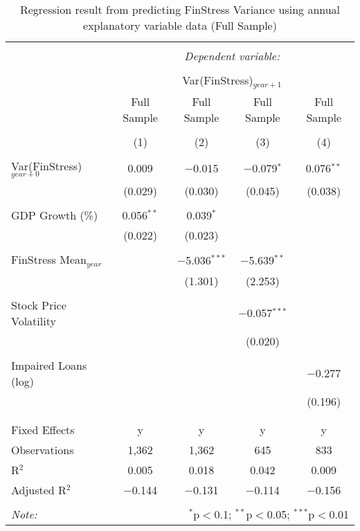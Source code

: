 
\begin{table}[!htbp] \centering 
  \caption{Regression result from predicting FinStress Variance using annual explanatory variable data (Full Sample)} 
  \label{annual_reg} 
\tiny 
\begin{tabular}{@{\extracolsep{5pt}}lcccc} 
\\[-1.8ex]\hline 
\hline \\[-1.8ex] 
 & \multicolumn{4}{c}{\textit{Dependent variable:}} \\ 
\cline{2-5} 
\\[-1.8ex] & \multicolumn{4}{c}{Var(FinStress)$_{year+1}$} \\ 
 & Full Sample & Full Sample & Full Sample & Full Sample \\ 
\\[-1.8ex] & (1) & (2) & (3) & (4)\\ 
\hline \\[-1.8ex] 
 Var(FinStress)$_{year+0}$ & 0.009 & $-$0.015 & $-$0.079$^{*}$ & 0.076$^{**}$ \\ 
  & (0.029) & (0.030) & (0.045) & (0.038) \\ 
  & & & & \\ 
 GDP Growth (\%) & 0.056$^{**}$ & 0.039$^{*}$ &  &  \\ 
  & (0.022) & (0.023) &  &  \\ 
  & & & & \\ 
 FinStress Mean$_{year}$ &  & $-$5.036$^{***}$ & $-$5.639$^{**}$ &  \\ 
  &  & (1.301) & (2.253) &  \\ 
  & & & & \\ 
 Stock Price Volatility &  &  & $-$0.057$^{***}$ &  \\ 
  &  &  & (0.020) &  \\ 
  & & & & \\ 
 Impaired Loans (log) &  &  &  & $-$0.277 \\ 
  &  &  &  & (0.196) \\ 
  & & & & \\ 
\hline \\[-1.8ex] 
Fixed Effects & y & y & y & y \\ 
Observations & 1,362 & 1,362 & 645 & 833 \\ 
R$^{2}$ & 0.005 & 0.018 & 0.042 & 0.009 \\ 
Adjusted R$^{2}$ & $-$0.144 & $-$0.131 & $-$0.114 & $-$0.156 \\ 
\hline 
\hline \\[-1.8ex] 
\textit{Note:}  & \multicolumn{4}{r}{$^{*}$p$<$0.1; $^{**}$p$<$0.05; $^{***}$p$<$0.01} \\ 
\end{tabular} 
\end{table} 
